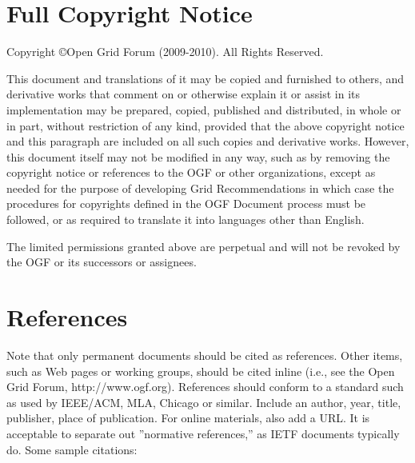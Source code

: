 \documentclass[10pt,a4paper]{article}
\begin{document}
\section{Full Copyright Notice}

Copyright \copyright Open Grid Forum (2009-2010). All Rights Reserved.

This document and translations of it may be copied and furnished to others, and derivative works that comment on or otherwise explain it or assist in its implementation may be prepared, copied, published and distributed, in whole or in part, without restriction of any kind, provided that the above copyright notice and this paragraph are included on all such copies and derivative works. However, this document itself may not be modified in any way, such as by removing the copyright notice or references to the OGF or other organizations, except as needed for the purpose of developing Grid Recommendations in which case the procedures for copyrights defined in the OGF Document process must be followed, or as required to translate it into languages other than English.

The limited permissions granted above are perpetual and will not be revoked by the OGF or its successors or assignees.

\section{References}

Note that only permanent documents should be cited as references. Other items, such as Web pages or working groups, should be cited inline (i.e., see the Open Grid Forum, http://www.ogf.org). References should conform to a standard such as used by IEEE/ACM, MLA, Chicago or similar. Include an author, year, title, publisher, place of publication. For online materials, also add a URL. It is acceptable to separate out ''normative references,'' as IETF documents typically do. Some sample citations: 
\end{document}
